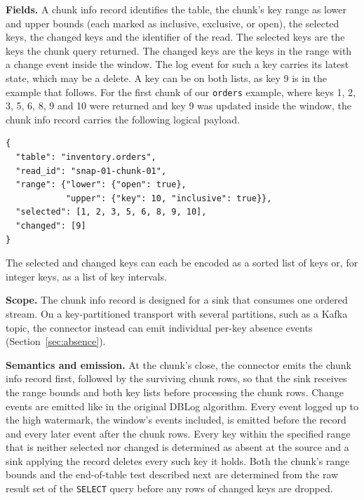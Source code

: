 \documentclass[sigconf,nonacm,10pt]{acmart}
\begin{document}
\textbf{Fields.} A chunk info record identifies the table, the chunk's key
range as lower and upper bounds (each marked as inclusive, exclusive, or open),
the selected keys, the changed keys and the identifier of the read. The selected keys are the keys the chunk query
returned. The changed keys are the keys in the range with a change event inside
the window. The log event for such a key carries its latest state, which may be
a delete. A key can be on both lists, as key 9 is in the example that follows. For the first chunk of our \texttt{orders} example,
where keys 1, 2, 3, 5, 6, 8, 9 and 10 were returned and key 9 was updated
inside the window, the chunk info record carries the following logical payload.\par
\begin{footnotesize}
\begin{trivlist}\item\relax
\noindent\begin{minipage}[t]{\columnwidth}
\begin{verbatim}
{
  "table": "inventory.orders",
  "read_id": "snap-01-chunk-01",
  "range": {"lower": {"open": true},
            "upper": {"key": 10, "inclusive": true}},
  "selected": [1, 2, 3, 5, 6, 8, 9, 10],
  "changed": [9]
}
\end{verbatim}
\end{minipage}\par\vspace{2.85pt}
\end{trivlist}
\end{footnotesize}
The selected and changed keys can each be encoded as a sorted list of keys or,
for integer keys, as a list of key intervals.

\textbf{Scope.} The chunk info record is designed for a sink that consumes one
ordered stream. On a key-partitioned transport with several partitions, such as a
Kafka topic, the connector instead can emit individual per-key absence events
(Section~\ref{sec:absence}).

\textbf{Semantics and emission.} At the chunk's close, the connector emits the chunk info record first, followed by the surviving 
chunk rows, so that the sink receives the range bounds and both key lists before processing the chunk rows. 
Change events are emitted like in the original DBLog algorithm. Every event logged up to the high watermark, the window's events included, 
is emitted before the record and every later event after the chunk rows. Every key within the specified range that is neither selected nor 
changed is determined as absent at the source and a sink applying the record deletes every such key it holds. Both the chunk's range bounds 
and the end-of-table test described next are determined from the raw result set of the \texttt{SELECT} query before any rows of changed 
keys are dropped.
\end{document}
